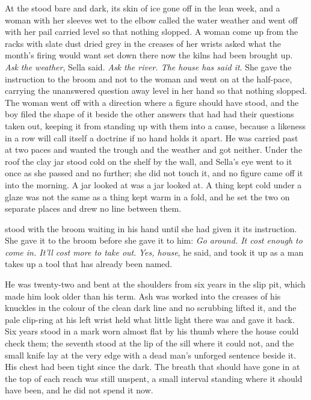 At  the  stood bare and dark, its skin of ice gone off in the lean week, and a woman with her sleeves wet to the elbow called the water weather and went off with her pail carried level so that nothing slopped. A woman come up from the racks with slate dust dried grey in the creases of her wrists asked what the month's firing would want set down there now the kilns had been brought up. \emph{Ask the weather}, Sella said. \emph{Ask the river. The house has said it}. She gave the instruction to the broom and not to the woman and went on at the half-pace, carrying the unanswered question away level in her hand so that nothing slopped. The woman went off with a direction where a figure should have stood, and the boy filed the shape of it beside the other answers that had had their questions taken out, keeping it from standing up with them into a cause, because a likeness in a row will call itself a doctrine if no hand holds it apart. He was carried past at two paces and wanted the trough and the weather and got neither. Under the roof the clay jar stood cold on the shelf by the wall, and Sella's eye went to it once as she passed and no further; she did not touch it, and no figure came off it into the morning. A jar looked at was a jar looked at. A thing kept cold under a glaze was not the same as a thing kept warm in a fold, and he set the two on separate places and drew no line between them.

 stood with the broom waiting in his hand until she had given it its instruction. She gave it to the broom before she gave it to him: \emph{Go around. It cost enough to come in. It'll cost more to take out}. \emph{Yes, house}, he said, and took it up as a man takes up a tool that has already been named.

He was twenty-two and bent at the shoulders from six years in the slip pit, which made him look older than his term. Ash was worked into the creases of his knuckles in the colour of the clean dark line and no scrubbing lifted it, and the pale clip-ring at his left wrist held what little light there was and gave it back. Six years stood in a mark worn almost flat by his thumb where the house could check them; the seventh stood at the lip of the sill where it could not, and the small knife lay at the very edge with a dead man's unforged sentence beside it. His chest had been tight since the dark. The breath that should have gone in at the top of each reach was still unspent, a small interval standing where it should have been, and he did not spend it now.

